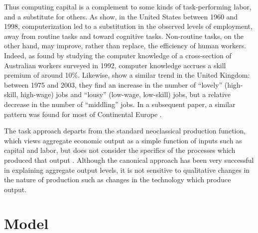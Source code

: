 Thus computing capital is a complement to some kinds of task-performing labor, and a substitute for others. As \citet{Levy2003} show, in the United States between 1960 and 1998, computerization led to a substitution in the observed levels of employment, away from routine tasks and toward cognitive tasks. Non-routine tasks, on the other hand, may improve, rather than replace, the efficiency of human workers. Indeed, as \citet{Borland2004} found by studying the computer knowledge of a cross-section of Australian workers surveyed in 1992, computer knowledge accrues a skill premium of around 10\%. Likewise, \citet{Goos2007} show a similar trend in the United Kingdom: between 1975 and 2003, they find an increase in the number of ``lovely'' (high-skill, high-wage) jobs and ``lousy'' (low-wage, low-skill) jobs, but a relative decrease in the number of ``middling'' jobs. In a subsequent paper, a similar pattern was found for most of Continental Europe \citep{Goos2009}.

The task approach departs from the standard neoclassical production function, which views aggregate economic output as a simple function of inputs such as capital and labor, but does not consider the specifics of the processes which produced that output \citep{Acemoglu2011}. Although the canonical approach has been very successful in explaining aggregate output levels, it is not sensitive to qualitative changes in the nature of production such as changes in the technology which produce output. 

\section{Model}

